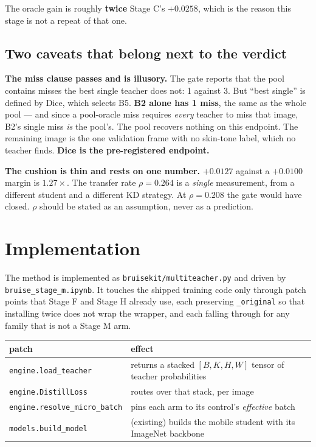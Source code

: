 \documentclass[11pt,a4paper]{article}
\begin{document}
The oracle gain is roughly \textbf{twice} Stage C's $+0.0258$, which is the
reason this stage is not a repeat of that one.

\subsection{Two caveats that belong next to the verdict}

\textbf{The miss clause passes and is illusory.} The gate reports that the pool
contains misses the best single teacher does not: 1 against 3. But ``best single''
is defined by Dice, which selects B5. \textbf{B2 alone has 1 miss}, the same as
the whole pool --- and since a pool-oracle miss requires \emph{every} teacher to
miss that image, B2's single miss \emph{is} the pool's. The pool recovers nothing
on this endpoint. The remaining image is the one validation frame with no
skin-tone label, which no teacher finds. \textbf{Dice is the pre-registered
endpoint.}

\textbf{The cushion is thin and rests on one number.} $+0.0127$ against a
$+0.0100$ margin is $1.27\times$. The transfer rate $\rho = 0.264$ is a
\emph{single} measurement, from a different student and a different KD strategy.
At $\rho = 0.208$ the gate would have closed. $\rho$ should be stated as an
assumption, never as a prediction.

\section{Implementation}

The method is implemented as \texttt{bruisekit/multiteacher.py} and driven by
\texttt{bruise\_stage\_m.ipynb}. It touches the shipped training code only
through patch points that Stage F and Stage H already use, each preserving
\texttt{\_original} so that installing twice does not wrap the wrapper, and each
falling through for any family that is not a Stage M arm.

\begin{center}
\small
\begin{tabular}{ll}
\toprule
patch & effect \\
\midrule
\texttt{engine.load\_teacher}       & returns a stacked $[B,K,H,W]$ tensor of teacher probabilities \\
\texttt{engine.DistillLoss}         & routes over that stack, per image \\
\texttt{engine.resolve\_micro\_batch} & pins each arm to its control's \emph{effective} batch \\
\texttt{models.build\_model}        & (existing) builds the mobile student with its ImageNet backbone \\
\bottomrule
\end{tabular}
\end{center}
\end{document}
